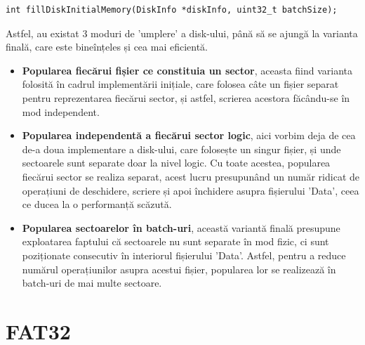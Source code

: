 \bigskip

\lstset{style=code-snyppet-style}
\begin{lstlisting}
int fillDiskInitialMemory(DiskInfo *diskInfo, uint32_t batchSize);
\end{lstlisting}

\bigskip

Astfel, au existat 3 moduri de 'umplere' a disk-ului, până să se ajungă la varianta finală, care este bineînțeles și cea mai eficientă.

\begin{itemize}
  \item \textbf{Popularea fiecărui fișier ce constituia un sector}, aceasta fiind varianta folosită în cadrul implementării inițiale, care folosea câte un fișier separat pentru reprezentarea fiecărui sector, și astfel, scrierea acestora făcându-se în mod independent.
  
  \item \textbf{Popularea independentă a fiecărui sector logic}, aici vorbim deja de cea de-a doua implementare a disk-ului, care folosește un singur fișier, și unde sectoarele sunt separate doar la nivel logic. Cu toate acestea, popularea fiecărui sector se realiza separat, acest lucru presupunând un număr ridicat de operațiuni de deschidere, scriere și apoi închidere asupra fișierului 'Data', ceea ce ducea la o performanță scăzută.
  
  \item \textbf{Popularea sectoarelor în batch-uri}, această variantă finală presupune exploatarea faptului că sectoarele nu sunt separate în mod fizic, ci sunt poziționate consecutiv în interiorul fișierului 'Data'. Astfel, pentru a reduce numărul operațiunilor asupra acestui fișier, popularea lor se realizează în batch-uri de mai multe sectoare.
  
\end{itemize}



















\newpage

\section{FAT32}

